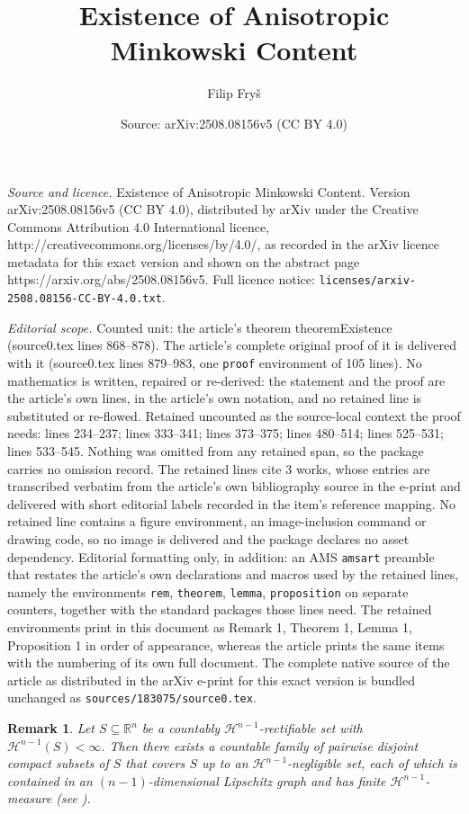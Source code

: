 \documentclass[10pt,a4paper]{amsart}
\title{Existence of Anisotropic Minkowski Content}
\author{Filip Fry\v{s}}
\date{Source: arXiv:2508.08156v5 (CC BY 4.0)}
\newtheorem{rem}{Remark}
\begin{document}
\maketitle

\noindent\emph{Source and licence.} Existence of Anisotropic Minkowski Content. Version arXiv:2508.08156v5 (CC BY 4.0), distributed by arXiv under the Creative Commons Attribution 4.0 International licence, http://creativecommons.org/licenses/by/4.0/, as recorded in the arXiv licence metadata for this exact version and shown on the abstract page https://arxiv.org/abs/2508.08156v5. Full licence notice: \texttt{licenses/arxiv-2508.08156-CC-BY-4.0.txt}.\par\smallskip

\noindent\textit{Editorial scope.} Counted unit: the article's theorem theoremExistence (source0.tex lines 868--878). The article's complete original proof of it is delivered with it (source0.tex lines 879--983, one \texttt{proof} environment of 105 lines). No mathematics is written, repaired or re-derived: the statement and the proof are the article's own lines, in the article's own notation, and no retained line is substituted or re-flowed.  Retained uncounted as the source-local context the proof needs: lines 234--237; lines 333--341; lines 373--375; lines 480--514; lines 525--531; lines 533--545.  Nothing was omitted from any retained span, so the package carries no omission record.  The retained lines cite 3 works, whose entries are transcribed verbatim from the article's own bibliography source in the e-print and delivered with short editorial labels recorded in the item's reference mapping.  No retained line contains a figure environment, an image-inclusion command or drawing code, so no image is delivered and the package declares no asset dependency.  Editorial formatting only, in addition: an AMS \texttt{amsart} preamble that restates the article's own declarations and macros used by the retained lines, namely the environments \texttt{rem}, \texttt{theorem}, \texttt{lemma}, \texttt{proposition} on separate counters, together with the standard packages those lines need.  The retained environments print in this document as Remark 1, Theorem 1, Lemma 1, Proposition 1 in order of appearance, whereas the article prints the same items with the numbering of its own full document.  The complete native source of the article as distributed in the arXiv e-print for this exact version is bundled unchanged as \texttt{sources/183075/source0.tex}.
\begin{rem}\label{R1}
Let $S \subseteq \mathbb{R}^n$ be a countably $\mathcal{H}^{n-1}$-rectifiable set with $\mathcal{H}^{n-1}(S) < \infty$.  
Then there exists a countable family of pairwise disjoint compact subsets of $S$ that covers $S$ up to an $\mathcal{H}^{n-1}$-negligible set, each of which is contained in an $(n-1)$-dimensional Lipschitz graph and has finite $\mathcal{H}^{n-1}$-measure (see \cite[Lemma 11.1 and Remark 11.7]{simon}). 
\end{rem}
\end{document}
